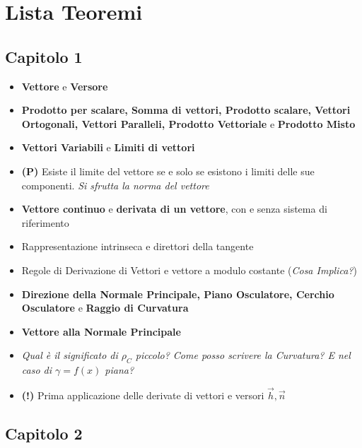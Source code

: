 \documentclass[11pt,a4paper,twoside]{article}
\begin{document}
\section*{Lista Teoremi}

\subsection*{Capitolo 1}

\begin{itemize}
	\item \textbf{Vettore} e \textbf{Versore}
	\item \textbf{Prodotto per scalare, Somma di vettori, Prodotto scalare, Vettori Ortogonali, Vettori Paralleli, Prodotto Vettoriale} e \textbf{Prodotto Misto}
	\item \textbf{Vettori Variabili} e \textbf{Limiti di vettori}
	\item \textbf{(P)} Esiste il limite del vettore se e solo se esistono i limiti delle sue componenti. \textit{Si sfrutta la norma del vettore}
	\item \textbf{Vettore continuo} e \textbf{derivata di un vettore}, con e senza sistema di riferimento
	\item Rappresentazione intrinseca e direttori della tangente
	\item Regole di Derivazione di Vettori e vettore a modulo costante (\textit{Cosa Implica?})
	\item \textbf{Direzione della Normale Principale, Piano Osculatore, Cerchio Osculatore} e \textbf{Raggio di Curvatura}
	\item \textbf{Vettore alla Normale Principale}
	\item \textit{Qual è il significato di $\rho_C$ piccolo? Come posso scrivere la Curvatura? E nel caso di $\gamma = f(x)$ piana?}
	\item \textbf{(!)} Prima applicazione delle derivate di vettori e versori $\vec h, \vec n$
\end{itemize}

\subsection*{Capitolo 2}
\end{document}
